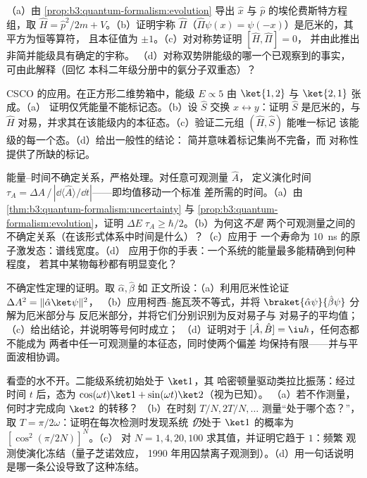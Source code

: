 \begin{exercise}[$\star\star$]\label{exo:b3:quantum-formalism:8}
（a）由 \cref{prop:b3:quantum-formalism:evolution} 导出
$\hat x$ 与 $\hat p$ 的埃伦费斯特方程组，取 $\hat H = \hat
p^2/2m + V$。（b）证明宇称 $\hat\Pi$（$\hat\Pi\psi(x) =
\psi(-x)$）是厄米的，其平方为恒等算符，
且本征值为 $\pm1$。（c）对对称势证明 $[\hat H, \hat\Pi] = 0$，
并由此推出非简并能级具有确定的宇称。
（d）对称双势阱能级的哪一个已观察到的事实，
可由此解释（回忆
本科二年级分册中的氨分子双重态）？
\end{exercise}

\begin{exercise}[$\star\star$]\label{exo:b3:quantum-formalism:9}
CSCO 的应用。在正方形二维势箱中，能级 $E
\propto 5$ 由 $\ket{1,2}$ 与 $\ket{2,1}$ 张成。（a）
证明仅凭能量不能标记态。（b）设 $\hat S$ 交换 $x
\leftrightarrow y$：证明 $\hat S$ 是厄米的，与 $\hat
H$ 对易，并求其在该能级内的本征态。（c）验证二元组 $(\hat H, \hat S)$ 能唯一标记
该能级的每一个态。（d）给出一般性的结论：
简并意味着标记集尚不完备，而
对称性提供了所缺的标记。
\end{exercise}

\begin{exercise}[$\star\star\star$]\label{exo:b3:quantum-formalism:10}
能量–时间不确定关系，严格处理。对任意可观测量 $\hat A$，
定义演化时间 $\tau_A = \Delta A\,/\,|\dd\langle\hat
A\rangle/\dd t|$——即均值移动一个标准
差所需的时间。（a）由 \cref{thm:b3:quantum-formalism:uncertainty} 与
\cref{prop:b3:quantum-formalism:evolution}，证明 $\Delta
E\;\tau_A \ge \hbar/2$。（b）为何这\emph{不是}
两个可观测量之间的不确定关系（在该形式体系中时间是什么）？（c）应用于
一个寿命为 \qty{10}{ns} 的原子激发态：谱线宽度。（d）
应用于你的手表：一个系统的能量最多能精确到何种程度，
若其中某物每秒都有明显变化？
\end{exercise}

\begin{exercise}[$\star\star\star$]\label{exo:b3:quantum-formalism:11}
不确定性定理的证明。取 $\hat\alpha, \hat\beta$ 如
正文所设：（a）利用厄米性论证 $\Delta A^2 = \|\hat\alpha\ket\psi\|^2$，
（b）应用柯西–施瓦茨不等式，并将
$\braket{\hat\alpha\psi}{\hat\beta\psi}$ 分解为厄米部分与
反厄米部分，并将它们分别识别为反对易子与
对易子的平均值；（c）给出结论，并说明等号何时成立；
（d）证明对于 $[\hat A, \hat B] = \iu\hbar$，任何态都不能成为
两者中任一可观测量的本征态，同时使两个偏差
均保持有限——并与平面波相协调。
\end{exercise}

\begin{exercise}[$\star\star\star$]\label{exo:b3:quantum-formalism:12}
看壶的水不开。二能级系统初始处于 $\ket1$，其
哈密顿量驱动类拉比振荡：经过时间 $t$ 后，态为
$\cos(\omega t)\ket1 + \sin(\omega t)\ket2$（视为已知）。
（a）若不作测量，何时才完成向 $\ket2$ 的转移？
（b）在时刻 $T/N, 2T/N, \dots$ 测量“处于哪个态？”，取 $T =
\pi/2\omega$：证明在每次检测时发现系统
\emph{仍}处于 $\ket1$ 的概率为 $[\cos^2(\pi/2N)]^N$。（c）
对 $N = 1, 4, 20, 100$ 求其值，并证明它趋于 $1$：频繁
观测使演化冻结（量子芝诺效应，
1990 年用囚禁离子观测到）。（d）用一句话说明
是哪一条公设导致了这种冻结。
\end{exercise}

